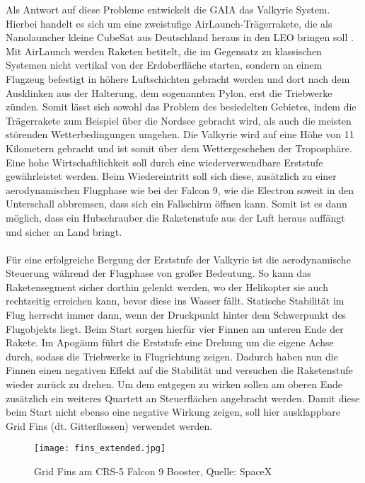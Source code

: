 Als Antwort auf diese Probleme entwickelt die \gls{GAIA} das Valkyrie System. Hierbei handelt es sich um eine zweistufige AirLaunch-Trägerrakete, die als  Nanolauncher kleine CubeSat aus Deutschland heraus in den LEO bringen soll \cite{GAIA}. Mit AirLaunch werden Raketen betitelt, die im Gegensatz zu klassischen Systemen nicht vertikal von der Erdoberfläche starten, sondern an einem Flugzeug befestigt in höhere Luftschichten gebracht werden und dort nach dem Ausklinken aus der Halterung, dem sogenannten Pylon, erst die Triebwerke zünden. Somit lässt sich sowohl das Problem des besiedelten Gebietes, indem die Trägerrakete zum Beispiel über die Nordsee gebracht wird, als auch die meisten störenden Wetterbedingungen umgehen. Die Valkyrie wird auf eine Höhe von 11 Kilometern gebracht \cite{flugbahnBarz} und ist somit über dem Wettergeschehen der Troposphäre. Eine hohe Wirtschaftlichkeit soll durch eine wiederverwendbare Erststufe gewährleistet werden. Beim Wiedereintritt soll sich diese, zusätzlich zu einer aerodynamischen Flugphase wie bei der Falcon 9, wie die Electron soweit in den Unterschall abbremsen, dass sich ein Fallschirm öffnen kann. Somit ist es dann möglich, dass ein Hubschrauber die Raketenstufe aus der Luft heraus auffängt und sicher an Land bringt.
\\~\\
Für eine erfolgreiche Bergung der Erststufe der Valkyrie ist die aerodynamische Steuerung während der Flugphase von großer Bedeutung. So kann das Raketensegment sicher dorthin gelenkt werden, wo der Helikopter sie auch rechtzeitig erreichen kann, bevor diese ins Wasser fällt. Statische Stabilität im Flug herrscht immer dann, wenn der Druckpunkt hinter dem Schwerpunkt des Flugobjekts liegt. Beim Start sorgen hierfür vier Finnen am unteren Ende der Rakete. Im Apogäum führt die Erststufe eine Drehung um die eigene Achse durch, sodass die Triebwerke in Flugrichtung zeigen. Dadurch haben nun die Finnen einen negativen Effekt auf die Stabilität und versuchen die Raketenstufe wieder zurück zu drehen. Um dem entgegen zu wirken sollen am oberen Ende zusätzlich ein weiteres Quartett an Steuerflächen angebracht werden. Damit diese beim Start nicht ebenso eine negative Wirkung zeigen, soll hier ausklappbare Grid Fins (dt. Gitterflossen) verwendet werden.

\begin{figure}[h]
	\centering
	\texttt{[image: fins\_extended.jpg]}
	\caption{Grid Fins am CRS-5 Falcon 9 Booster, Quelle: SpaceX}
\end{figure}

